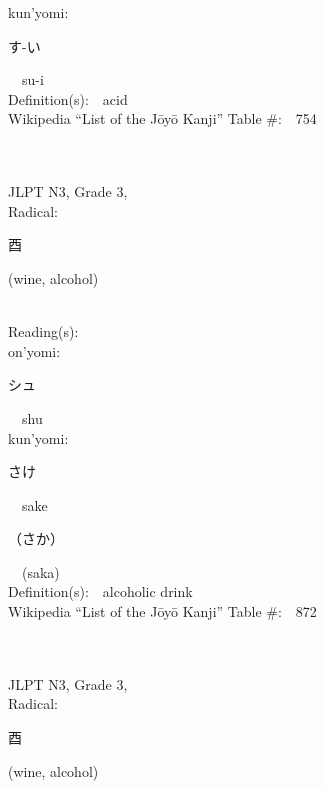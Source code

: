 \begin{multicols}{2}
{\hspace*{1em}}kun'yomi:\ \ \\
{\hspace*{2em}}{\begin{CJK}{UTF8}{min} す-い \end{CJK}}\ \ su-i\ \ \\
Definition(s):\ \ acid \\
Wikipedia ``List of the J\=oy\=o Kanji'' Table \#:\ \ 754 \\
\ \ \\
{\fontsize{34pt}{40pt}  }\ \ \\  %
{JLPT N3, Grade 3, \\Radical:\ \ {\begin{CJK}{UTF8}{min} 酉 \end{CJK}} (wine, alcohol) } \\
Reading(s):\ \ \\
{\hspace*{1em}}on'yomi:\ \ \\
{\hspace*{2em}}{\begin{CJK}{UTF8}{min} シュ \end{CJK}}\ \ shu\ \ \\
{\hspace*{1em}}kun'yomi:\ \ \\
{\hspace*{2em}}{\begin{CJK}{UTF8}{min} さけ \end{CJK}}\ \ sake\ \ \\
{\hspace*{2em}}{\begin{CJK}{UTF8}{min} （さか） \end{CJK}}\ \ (saka)\ \ \\
Definition(s):\ \ alcoholic drink \\
Wikipedia ``List of the J\=oy\=o Kanji'' Table \#:\ \ 872 \\
\ \ \\
{\fontsize{34pt}{40pt}  }\ \ \\  %
{JLPT N3, Grade 3, \\Radical:\ \ {\begin{CJK}{UTF8}{min} 酉 \end{CJK}} (wine, alcohol) } \\

\end{multicols}
